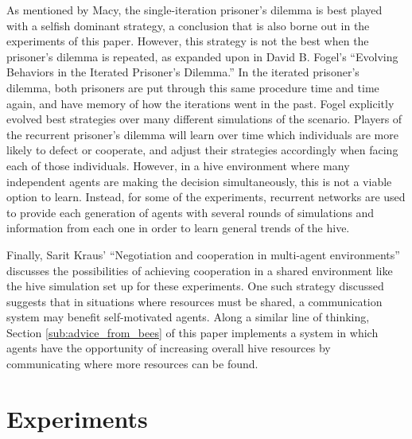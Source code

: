\documentclass[twoside]{article}
\begin{document}
\begin{multicols}{2}
	As mentioned by Macy, the single-iteration prisoner's dilemma is best played with a selfish dominant strategy, a conclusion that is also borne out in the experiments of this paper. However, this strategy is not the best when the prisoner's dilemma is repeated, as expanded upon in David B. Fogel's ``Evolving Behaviors in the Iterated Prisoner's Dilemma.'' \cite{fogel} In the iterated prisoner's dilemma, both prisoners are put through this same procedure time and time again, and have memory of how the iterations went in the past. Fogel explicitly evolved best strategies over many different simulations of the scenario. Players of the recurrent prisoner's dilemma will learn over time which individuals are more likely to defect or cooperate, and adjust their strategies accordingly when facing each of those individuals. However, in a hive environment where many independent agents are making the decision simultaneously, this is not a viable option to learn. Instead, for some of the experiments, recurrent networks are used to provide each generation of agents with several rounds of simulations and information from each one in order to learn general trends of the hive.

	Finally, Sarit Kraus' ``Negotiation and cooperation in multi-agent environments'' discusses the possibilities of achieving cooperation in a shared environment like the hive simulation set up for these experiments. \cite{kraus} One such strategy discussed suggests that in situations where resources must be shared, a communication system may benefit self-motivated agents. Along a similar line of thinking, Section \ref{sub:advice_from_bees} of this paper implements a system in which agents have the opportunity of increasing overall hive resources by communicating where more resources can be found. 



	\section{Experiments} %
	\label{sec:experiments}


\end{multicols}
\end{document}

